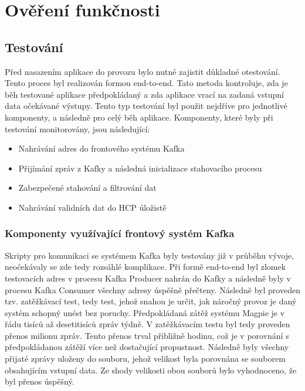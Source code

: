\documentclass[thesis=M,czech,hidelinks]{FITthesis}[2013/05/06]
\begin{document}
\chapter{Ověření funkčnosti}

\section{Testování}
Před nasazením aplikace do provozu bylo nutné zajistit důkladné otestování. Tento proces byl realizován formou end-to-end. Tato metoda kontroluje, zda je běh testované aplikace předpokládaný a zda aplikace vrací na zadaná vstupní data očekávané výstupy. Tento typ testování byl použit nejdříve pro jednotlivé komponenty, a následně pro celý běh aplikace. Komponenty, které byly při testování monitorovány, jsou následující:
\begin{itemize}
	\item Nahrávání adres do frontového systému Kafka
	\item Přijímání zpráv z Kafky a následná inicializace stahovacího procesu
	\item Zabezpečené stahování a filtrování dat
	\item Nahrávání validních dat do HCP úložistě 
\end{itemize}



\subsection{Komponenty využívající frontový systém Kafka}
Skripty pro komunikaci se systémem Kafka byly testovány již v průběhu vývoje, neočekávaly se zde tedy rozsáhlé komplikace. Při formě end-to-end byl zlomek testovacích adres v procesu Kafka Producer nahrán do Kafky a následně byly v procesu Kafka Consumer všechny adresy úspěšně přečteny. Následně byl proveden tzv. zatěžkávací test, tedy test, jehož snahou je určit, jak náročný provoz je daný systém schopný unést bez poruchy. Předpokládaná zátěž systému Magpie je v řádu tisíců až desetitisíců zpráv týdně. V zatěžkávacím testu byl tedy proveden přenos milionu zpráv. Tento přenos trval přibližně hodinu, což je v porovnání s předpokládanou zátěží více než dostačující propustnost. Následně byly všechny přijaté zprávy uloženy do souboru, jehož velikost byla porovnána se souborem obsahujícím vstupní data. Ze shody velikosti obou souborů bylo vyhodnoceno, že byl přenos úspěšný.
\end{document}
